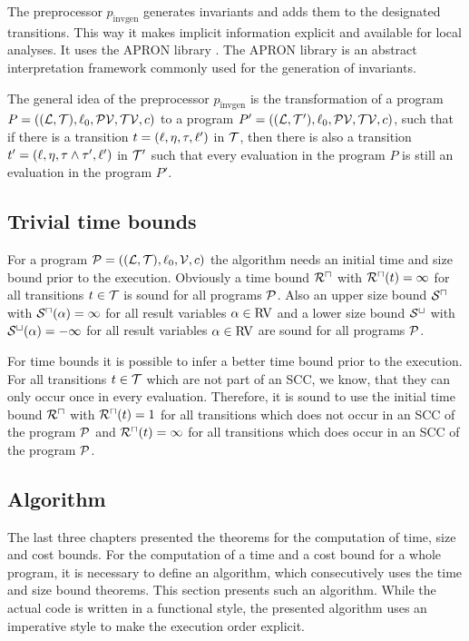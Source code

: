 The preprocessor $p_{\text{invgen}}$ generates invariants and adds them to the designated transitions.
This way it makes implicit information explicit and available for local analyses.
It uses the APRON library \cite{apron}.
The APRON library is an abstract interpretation framework commonly used for the generation of invariants.

The general idea of the preprocessor $p_{\text{invgen}}$ is the transformation of a program $P = ((\mathcal{L}, \mathcal{T}), \ell_0, \mathcal{PV}, \mathcal{TV}, c)$ to a program $P' = ((\mathcal{L}, \mathcal{T}'), \ell_0, \mathcal{PV}, \mathcal{TV}, c)$, such that if there is a transition $t = (\ell, \eta, \tau, \ell')$ in $\mathcal{T}$, then there is also a transition $t' = (\ell, \eta, \tau \wedge \tau', \ell')$ in $\mathcal{T}'$ such that every evaluation in the program $P$ is still an evaluation in the program $P'$.

\subsection{Trivial time bounds}

For a program $\mathcal{P} = ((\mathcal{L}, \mathcal{T}), \ell_0, \mathcal{V}, c)$ the algorithm needs an initial time and size bound prior to the execution.
Obviously a time bound ${\mathcal{R}^\sqcap}$ with ${\mathcal{R}^\sqcap}(t) = \infty$ for all transitions $t \in \mathcal{T}$ is sound for all programs $\mathcal{P}$.
Also an upper size bound ${\mathcal{S}^\sqcap}$ with ${\mathcal{S}^\sqcap}(\alpha) = \infty$ for all result variables $\alpha \in \text{RV}$ and a lower size bound ${\mathcal{S}^\sqcup}$ with ${\mathcal{S}^\sqcup}(\alpha) = -\infty$ for all result variables $\alpha \in \text{RV}$ are sound for all programs $\mathcal{P}$.

For time bounds it is possible to infer a better time bound prior to the execution.
For all transitions $t \in \mathcal{T}$ which are not part of an SCC, we know, that they can only occur once in every evaluation.
Therefore, it is sound to use the initial time bound ${\mathcal{R}^\sqcap}$ with ${\mathcal{R}^\sqcap}(t) = 1$ for all transitions which does not occur in an SCC of the program $\mathcal{P}$ and ${\mathcal{R}^\sqcap}(t) = \infty$ for all transitions which does occur in an SCC of the program $\mathcal{P}$.

\subsection{Algorithm}

The last three chapters presented the theorems for the computation of time, size and cost bounds.
For the computation of a time and a cost bound for a whole program, it is necessary to define an algorithm, which consecutively uses the time and size bound theorems.
This section presents such an algorithm.
While the actual code is written in a functional style, the presented algorithm uses an imperative style to make the execution order explicit.

